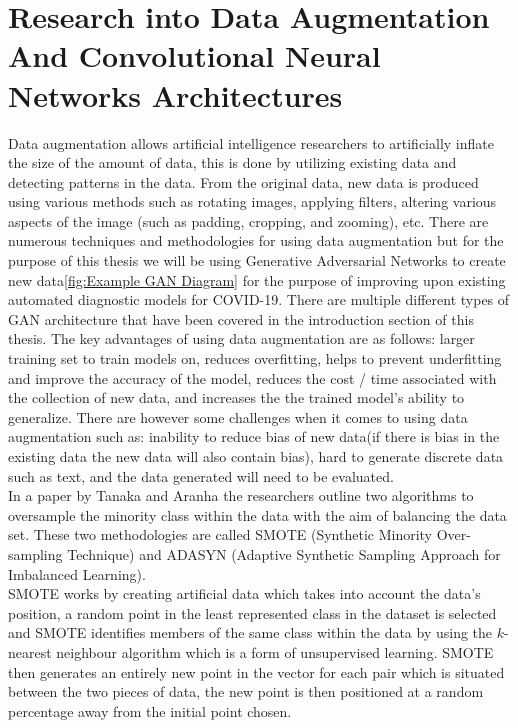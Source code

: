 \section{Research into Data Augmentation And Convolutional Neural Networks Architectures}
Data augmentation allows artificial intelligence researchers to artificially inflate the size of the amount of data, this is done by utilizing existing data and detecting patterns in the data.  From the original data, new data is produced using various methods such as rotating images, applying filters, altering various aspects of the image (such as padding, cropping, and zooming), etc. There are numerous techniques and methodologies for using data augmentation but for the purpose of this thesis we will be using Generative Adversarial Networks to create new data\ref{fig:Example GAN Diagram} for the purpose of improving upon existing automated diagnostic models for COVID-19.  There are multiple different types of GAN architecture that have been covered in the introduction section of this thesis.  The key advantages of using data augmentation are as follows: larger training set to train models on,  reduces overfitting, helps to prevent underfitting and improve the accuracy of the model, reduces the cost / time associated with the collection of new data, and increases the the trained model's ability to generalize.  There are however some challenges when it comes to using data augmentation such as: inability to reduce bias of new data(if there is bias in the existing data the new data will also contain bias), hard to generate discrete data such as text, and the data generated will need to be evaluated.
\\
In a paper by Tanaka and Aranha\cite{litReviewGanDataAugmentation} the researchers outline two algorithms to oversample the minority class within the data with the aim of balancing the data set.  These two methodologies are called SMOTE (Synthetic Minority Over-sampling Technique)\cite{litReviewSmote} and ADASYN (Adaptive Synthetic Sampling Approach for Imbalanced Learning)\cite{litReviewAdasyn}.  
\\
SMOTE works by creating artificial data which takes into account the data's position, a random point in the least represented class in the dataset is selected and SMOTE identifies members of the same class within the data by using the $k$-nearest neighbour algorithm which is a form of unsupervised learning.  SMOTE then generates an entirely new point in the vector for each pair which is situated between the two pieces of data, the new point is then positioned at a random percentage away from the initial point chosen.\cite{litReviewGanDataAugmentation}
